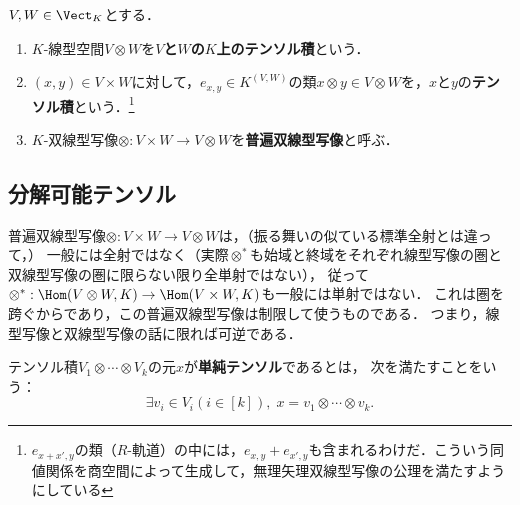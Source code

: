 \documentclass[uplatex, dvipdfmx]{jsreport}
\begin{document}
\begin{definition}
    $V,W\in\Vect_K$とする．
    \begin{enumerate}
        \item $K$-線型空間$V\otimes W$を\textbf{$V$と$W$の$K$上のテンソル積}という．
        \item $(x,y)\in V\times W$に対して，$e_{x,y}\in K^{(V,W)}$の類$x\otimes y\in V\otimes W$を，$x$と$y$の\textbf{テンソル積}という．\footnote{$e_{x+x',y}$の類（$R$-軌道）の中には，$e_{x,y}+e_{x',y}$も含まれるわけだ．こういう同値関係を商空間によって生成して，無理矢理双線型写像の公理を満たすようにしている}
        \item $K$-双線型写像$\otimes:V\times W\to V\otimes W$を\textbf{普遍双線型写像}と呼ぶ．
    \end{enumerate}
\end{definition}

\subsection{分解可能テンソル}

\begin{tcolorbox}[colframe=ForestGreen, colback=ForestGreen!10!white, breakable,
    title=テンソル積に乗り込む基底]
    普遍双線型写像$\otimes:V\times W\to V\otimes W$は，（振る舞いの似ている標準全射とは違って，）
    一般には全射ではなく（実際$\otimes^*$も始域と終域をそれぞれ線型写像の圏と双線型写像の圏に限らない限り全単射ではない），
    従って$\otimes^*:\Hom(V\otimes W,K)\to\Hom(V\times W,K)$も一般には単射ではない．
    これは圏を跨ぐからであり，この普遍双線型写像は制限して使うものである．
    つまり，線型写像と双線型写像の話に限れば可逆である．
\end{tcolorbox}

\begin{definition}
    テンソル積$V_1\otimes\cdots\otimes V_k$の元$x$が\textbf{単純テンソル}であるとは，
    次を満たすことをいう：
    \[\exists v_i\in V_i(i\in[k]),\;x=v_1\otimes\cdots\otimes v_k.\]
\end{definition}
\end{document}
